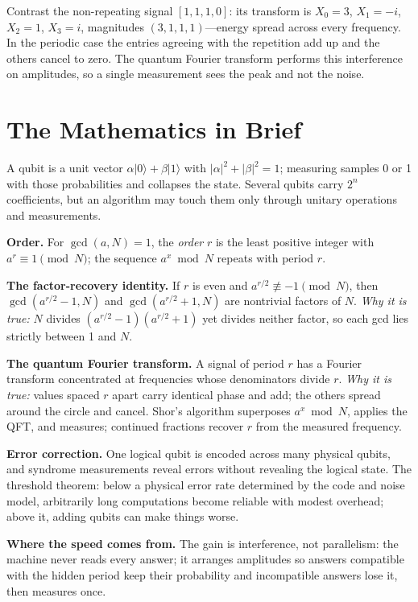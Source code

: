 Contrast the non-repeating signal $[1,1,1,0]$: its transform is $X_0=3$, $X_1=-i$, $X_2=1$, $X_3=i$, magnitudes $(3,1,1,1)$---energy spread across every frequency. In the periodic case the entries agreeing with the repetition add up and the others cancel to zero. The quantum Fourier transform performs this interference on amplitudes, so a single measurement sees the peak and not the noise.

\section{The Mathematics in Brief}

A qubit is a unit vector $\alpha\lvert 0\rangle+\beta\lvert 1\rangle$ with $|\alpha|^2+|\beta|^2=1$; measuring samples 0 or 1 with those probabilities and collapses the state. Several qubits carry $2^n$ coefficients, but an algorithm may touch them only through unitary operations and measurements.

\noindent\textbf{Order.} For $\gcd(a,N)=1$, the \emph{order} $r$ is the least positive integer with $a^r\equiv 1\pmod N$; the sequence $a^x\bmod N$ repeats with period $r$.

\noindent\textbf{The factor-recovery identity.} If $r$ is even and $a^{r/2}\not\equiv -1\pmod N$, then $\gcd(a^{r/2}-1,N)$ and $\gcd(a^{r/2}+1,N)$ are nontrivial factors of $N$. \emph{Why it is true:} $N$ divides $(a^{r/2}-1)(a^{r/2}+1)$ yet divides neither factor, so each gcd lies strictly between 1 and $N$.

\noindent\textbf{The quantum Fourier transform.} A signal of period $r$ has a Fourier transform concentrated at frequencies whose denominators divide $r$. \emph{Why it is true:} values spaced $r$ apart carry identical phase and add; the others spread around the circle and cancel. Shor's algorithm superposes $a^x\bmod N$, applies the QFT, and measures; continued fractions recover $r$ from the measured frequency.

\noindent\textbf{Error correction.} One logical qubit is encoded across many physical qubits, and syndrome measurements reveal errors without revealing the logical state. The threshold theorem: below a physical error rate determined by the code and noise model, arbitrarily long computations become reliable with modest overhead; above it, adding qubits can make things worse.

\noindent\textbf{Where the speed comes from.} The gain is interference, not parallelism: the machine never reads every answer; it arranges amplitudes so answers compatible with the hidden period keep their probability and incompatible answers lose it, then measures once.

